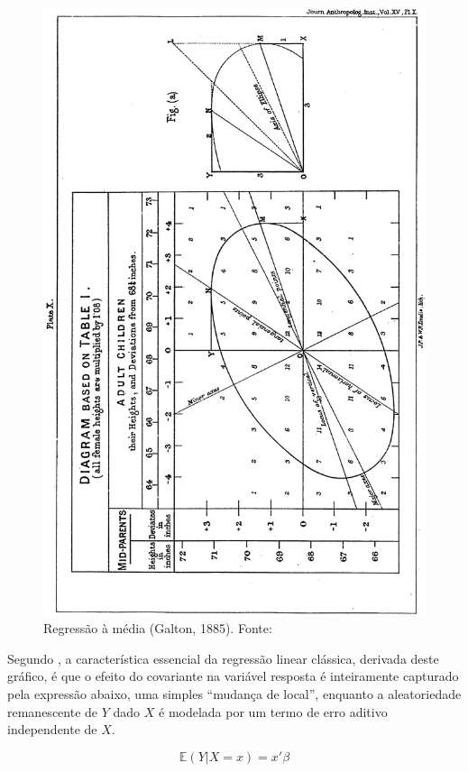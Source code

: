 \documentclass[a4paper, 12pt]{article}
\begin{document}
\begin{figure}
\centering
\includegraphics{image_Galton.png}
\caption{Regressão à média (Galton, 1885). Fonte:
\textcite[348]{koenker2000}\label{galton}}
\end{figure}

Segundo \textcite[p.~349]{koenker2000}, a característica essencial da
regressão linear clássica, derivada deste gráfico, é que o efeito do
covariante na variável resposta é inteiramente capturado pela expressão
abaixo, uma simples ``mudança de local'', enquanto a aleatoriedade
remanescente de \(Y\) dado \(X\) é modelada por um termo de erro aditivo
independente de \(X\).

\[\mathbb{E}(Y|X = x) = x'\beta\]
\end{document}
